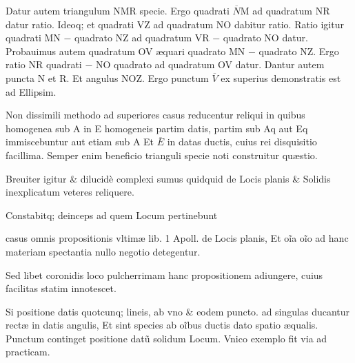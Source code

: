 \documentclass[11pt,a4paper]{article}
\begin{document}

Datur autem triangulum NMR specie. Ergo quadrati $\overline{N}$M ad quadratum NR datur ratio. Ideoq; et quadrati VZ ad quadratum NO dabitur ratio. Ratio igitur quadrati MN $-$ quadrato NZ ad quadratum VR $-$ quadrato NO datur. Probauimus autem quadratum OV æquari quadrato MN $-$ quadrato NZ. Ergo ratio NR quadrati $-$ NO quadrato ad quadratum OV datur. Dantur autem puncta N et R. Et angulus NOZ. Ergo punctum $\overline{V}$ ex superius demonstratis est ad Ellipsim.

Non dissimili methodo ad superiores casus reducentur reliqui in quibus homogenea sub A in E homogeneis partim datis, partim sub Aq aut Eq immiscebuntur aut etiam sub A Et $\overline{E}$ in datas ductis, cuius rei disquisitio facillima. Semper enim beneficio trianguli specie noti construitur quæstio.

Breuiter igitur \& dilucidè complexi sumus quidquid de Locis planis \& Solidis inexplicatum veteres reliquere.

Constabitq; deinceps ad quem Locum pertinebunt


casus omnis propositionis vltimæ lib. 1 Apoll. de Locis planis, Et oĩa oĩo ad hanc materiam spectantia nullo negotio detegentur.

Sed libet coronidis loco pulcherrimam hanc propositionem adiungere, cuius facilitas statim innotescet.

Si positione datis quotcunq; lineis, ab vno \& eodem puncto. ad singulas ducantur rectæ in datis angulis, Et sint species ab oĩbus ductis dato spatio æqualis. Punctum continget positione datũ solidum Locum. Vnico exemplo fit via ad practicam.
\end{document}

